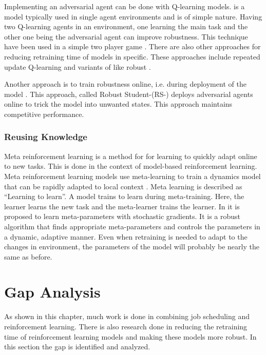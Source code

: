 Implementing an adversarial agent can be done with Q-learning models.
\Ql is a model typically used in single agent environments and is of simple
nature. Having two Q-learning agents in an environment, one learning the main
task and the other one being the adversarial agent can improve robustness.
This technique have been used in a simple two player game \cite{littman1994}.
There are also other approaches for reducing retraining time of \ql models in
specific. These approaches include repeated update Q-learning
\cite{abdallah2016} and variants of \dqn like robust \dqn \cite{chen2018}.

Another approach is to train robustness online, i.e. during deployment of the
model \cite{fisher2019}. This approach, called Robust Student-\dqn (RS-\dqn)
deploys adversarial agents online to trick the model into unwanted states.
This approach maintains competitive performance.


\subsubsection{Reusing Knowledge}\label{sec:reusing}

Meta reinforcement learning is a method for for learning to quickly adapt
online to new tasks. This is done in the context of model-based reinforcement
learning. Meta reinforcement learning models use meta-learning to train a
dynamics model that can be rapidly adapted to local context
\cite{nagabandi2019}. Meta learning is described as ``Learning to learn''. A
model trains to learn during meta-training. Here, the learner learns the new
task and the meta-learner trains the learner. In \cite{schweighofer2003} it is
proposed to learn meta-parameters with stochastic gradients. It is a robust
algorithm that finds appropriate meta-parameters and controls the parameters
in a dynamic, adaptive manner. Even when retraining is needed to adapt to the
changes in environment, the parameters of the model will probably be nearly
the same as before.


\section{Gap Analysis}

As shown in this chapter, much work is done in combining job scheduling and
reinforcement learning. There is also research done in reducing the retraining
time of reinforcement learning models and making these models more robust. In
this section the gap is identified and analyzed.

